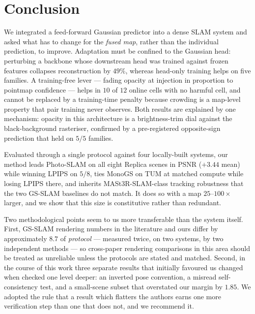 \section{Conclusion}
\label{sec:conclusion}

We integrated a feed-forward Gaussian predictor into a dense SLAM system and
asked what has to change for the \emph{fused map}, rather than the individual
prediction, to improve. Adaptation must be confined to the Gaussian head:
perturbing a backbone whose downstream head was trained against frozen
features collapses reconstruction by $49\%$, whereas head-only training helps
on five families. A training-free lever --- fading opacity at injection in
proportion to pointmap confidence --- helps in $10$ of $12$ online cells with no
harmful cell, and cannot be replaced by a training-time penalty because
crowding is a map-level property that pair training never observes. Both
results are explained by one mechanism: opacity in this architecture is a
brightness-trim dial against the black-background rasteriser, confirmed by a
pre-registered opposite-sign prediction that held on $5/5$ families.

Evaluated through a single protocol against four locally-built systems, our
method leads Photo-SLAM on all eight Replica scenes in PSNR ($+3.44$\dB{}
mean) while winning LPIPS on $5/8$, ties MonoGS on TUM at matched compute
while losing LPIPS there, and inherits MASt3R-SLAM-class tracking robustness
that the two GS-SLAM baselines do not match. It does so with a map
$25$--$100\times$ larger, and we show that this size is constitutive rather
than redundant.

Two methodological points seem to us more transferable than the system itself.
First, GS-SLAM rendering numbers in the literature and ours differ by
approximately $8.7$\dB{} of \emph{protocol} --- measured twice, on two systems,
by two independent methods --- so cross-paper rendering comparisons in this
area should be treated as unreliable unless the protocols are stated and
matched. Second, in the course of this work three separate results that
initially favoured us changed when checked one level deeper: an inverted pose
convention, a misread self-consistency test, and a small-scene subset that
overstated our margin by $1.85$\dB{}. We adopted the rule that a result which
flatters the authors earns one more verification step than one that does not,
and we recommend it.
